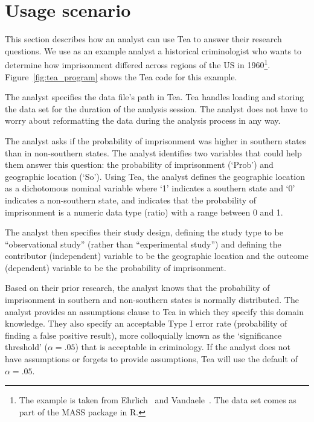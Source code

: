 \section{Usage scenario}\label{usageScenarioTea}
\figureTeaProgram

This section describes how an analyst can use Tea to answer their research
questions. We use as an example analyst a historical criminologist who wants to
determine how imprisonment differed across regions of the US in
1960\footnote{The example is taken from Ehrlich~\cite{ehrlich1973participation}
and Vandaele~\cite{vandaele1987participation}. The data set comes as part of the
MASS package in R.}. Figure~\ref{fig:tea_program} shows the Tea code for this
example.

The analyst specifies the data file's path in Tea. Tea handles loading and
storing the data set for the duration of the analysis session. The analyst does
not have to worry about reformatting the data during the analysis process in any way.

The analyst asks if the probability of imprisonment was higher in
southern states than in non-southern states. The analyst identifies
two variables that could help them answer this question: the
probability of imprisonment (`Prob') and geographic location
(`So'). %
Using Tea, the analyst defines the geographic
location as a dichotomous nominal variable where `1' indicates a
southern state and `0' indicates a non-southern state, and indicates that the
probability of imprisonment is a numeric data type (ratio) with a
range between 0 and 1. %

The analyst then specifies their study design, defining the study type
to be ``observational study'' (rather than ``experimental study'') and
defining the contributor (independent) variable to be the geographic location and
the outcome (dependent) variable to be the probability of
imprisonment.

Based on their prior research, the analyst knows that the probability
of imprisonment in southern and non-southern states is normally
distributed. The analyst provides an assumptions clause to Tea in
which they specify this domain knowledge. They also specify an
acceptable Type I error rate (probability of finding a false positive
result), more colloquially known as the `significance threshold'
($\alpha = .05$) that is acceptable in criminology. If the analyst
does not have assumptions or forgets to provide assumptions, Tea will
use the default of $\alpha = .05$.

